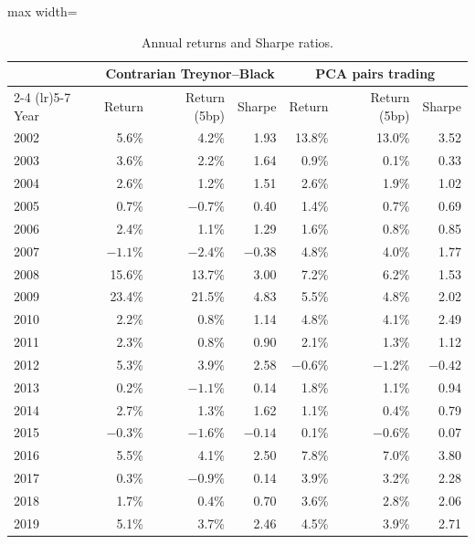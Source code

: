 \documentclass[11pt,letterpaper]{article}
\begin{document}
\begin{table}[!htbp]
    \centering
    \caption{Annual returns and Sharpe ratios.}
    \label{tab:yearly}
    \begin{adjustbox}{max width=\linewidth}
        \begin{tabular}{lrrrrrr}
            \toprule
            & \multicolumn{3}{c}{Contrarian Treynor--Black} & \multicolumn{3}{c}{PCA pairs trading} \\
            \cmidrule(lr){2-4} \cmidrule(lr){5-7}
            Year & Return & Return (5bp) & Sharpe & Return & Return (5bp) & Sharpe \\
            \midrule
            2002 & 5.6\% & 4.2\% & 1.93 & 13.8\% & 13.0\% & 3.52 \\
            2003 & 3.6\% & 2.2\% & 1.64 & 0.9\% & 0.1\% & 0.33 \\
            2004 & 2.6\% & 1.2\% & 1.51 & 2.6\% & 1.9\% & 1.02 \\
            2005 & 0.7\% & $-0.7\%$ & 0.40 & 1.4\% & 0.7\% & 0.69 \\
            2006 & 2.4\% & 1.1\% & 1.29 & 1.6\% & 0.8\% & 0.85 \\
            2007 & $-1.1\%$ & $-2.4\%$ & $-0.38$ & 4.8\% & 4.0\% & 1.77 \\
            2008 & 15.6\% & 13.7\% & 3.00 & 7.2\% & 6.2\% & 1.53 \\
            2009 & 23.4\% & 21.5\% & 4.83 & 5.5\% & 4.8\% & 2.02 \\
            2010 & 2.2\% & 0.8\% & 1.14 & 4.8\% & 4.1\% & 2.49 \\
            2011 & 2.3\% & 0.8\% & 0.90 & 2.1\% & 1.3\% & 1.12 \\
            2012 & 5.3\% & 3.9\% & 2.58 & $-0.6\%$ & $-1.2\%$ & $-0.42$ \\
            2013 & 0.2\% & $-1.1\%$ & 0.14 & 1.8\% & 1.1\% & 0.94 \\
            2014 & 2.7\% & 1.3\% & 1.62 & 1.1\% & 0.4\% & 0.79 \\
            2015 & $-0.3\%$ & $-1.6\%$ & $-0.14$ & 0.1\% & $-0.6\%$ & 0.07 \\
            2016 & 5.5\% & 4.1\% & 2.50 & 7.8\% & 7.0\% & 3.80 \\
            2017 & 0.3\% & $-0.9\%$ & 0.14 & 3.9\% & 3.2\% & 2.28 \\
            2018 & 1.7\% & 0.4\% & 0.70 & 3.6\% & 2.8\% & 2.06 \\
            2019 & 5.1\% & 3.7\% & 2.46 & 4.5\% & 3.9\% & 2.71 \\

\end{tabular}
\end{adjustbox}
\end{table}
\end{document}
